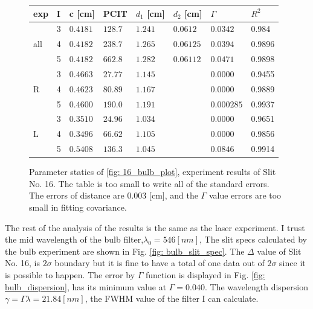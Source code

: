 \documentclass{article}
\begin{document}
\begin{figure}[H]
  \begin{tabular}{  m{0.6cm}|m{0.3cm}|m{1.7cm}|m{1.7cm}|m{2cm}|m{2cm}|m{2cm}|m{1cm} } 
      exp & I & c [cm]& PCIT & $d_1$ [cm] & $d_2$ [cm] & $\Gamma$ & $R^2$ \\ \hline \hline
      \multirow{3}{*}{all}& 3 & $0.4181$& $128.7$& $1.241 $& $0.0612 $& $0.0342$& 0.984\\ \cline{2-8}
                          & 4 & $0.4182$& $238.7$& $1.265$& $0.06125$& $0.0394$& 0.9896\\ \cline{2-8} 
                          & 5 &$0.4182$& $662.8 $& $1.282$& $0.06112  $& $0.0471$& 0.9898\\ \hline
      \multirow{3}{*}{R}  & 3 &$0.4663$& $27.77 $& $1.145 $&& $0.0000$& 0.9455\\  \cline{2-8}
                          & 4 &$0.4623$& $80.89$& $1.167$&& $0.0000$& 0.9889\\ \cline{2-8}
                          & 5 &$0.4600$& $190.0$& $1.191$&& $0.000285$& 0.9937\\ \hline
      \multirow{3}{*}{L}  & 3 & $0.3510$& $24.96$& $1.034$&& $0.0000$& 0.9651\\ \cline{2-8}
                          & 4 &$0.3496$& $66.62$& $1.105 $&& $0.0000$& 0.9856\\ \cline{2-8}
                          & 5 &$0.5408$& $136.3$& $1.045$&& $0.0846$& 0.9914\\ \hline
  \end{tabular}
  \caption{Parameter statics of \ref{fig: 16_bulb_plot}, experiment results of Slit No. 16.
   The table is too small to write all of the standard errors.
   The errors of distance are $0.003$ [cm], and the $\Gamma$ value errors are too small in fitting covariance.
  }
  \label{fig: 16_bulb_parmeters}
\end{figure}


The rest of the analysis of the results is the same as the laser experiment.
I trust the mid wavelength of the bulb filter,$\lambda_0 =  546 [nm]$,
The slit specs calculated by the bulb experiment are shown in Fig. \ref{fig: bulb_slit_spec}.
The $\Delta$ value of Slit No. 16, is $2 \sigma$ boundary but it is fine to have a total of one data out of $2 \sigma$ since it is possible to happen.
The error by $\Gamma$ function is displayed in Fig. \ref{fig: bulb_dispersion}, has its minimum value at $\Gamma =0.040$.
The wavelength dispersion $\gamma = \Gamma \lambda = 21.84 [nm]$, the FWHM value of the filter I can calculate.
\end{document}
